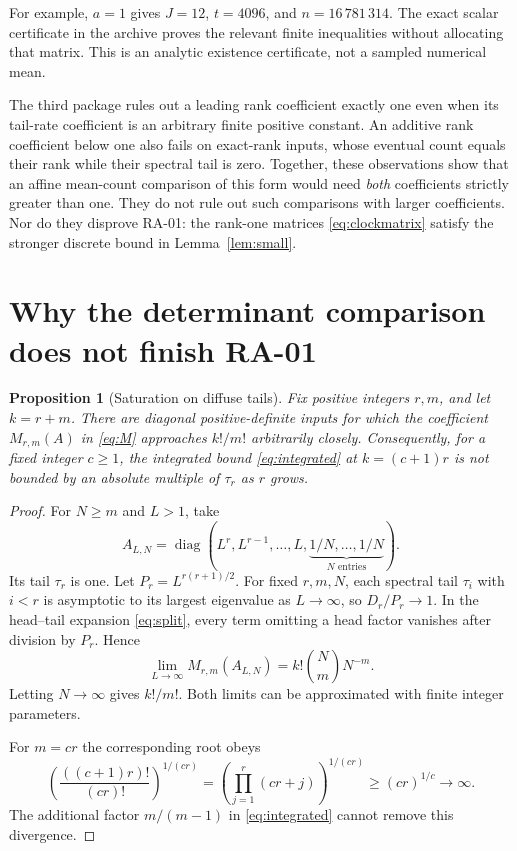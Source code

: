 \documentclass[11pt]{article}
\newtheorem{proposition}[theorem]{Proposition}
\theoremstyle{remark}\newtheorem{remark}[theorem]{Remark}
\begin{document}
For example, $a=1$ gives $J=12$, $t=4096$, and $n=16\,781\,314$. The exact scalar certificate in the archive proves the relevant finite inequalities without allocating that matrix. This is an analytic existence certificate, not a sampled numerical mean.

The third package rules out a leading rank coefficient exactly one even when its tail-rate coefficient is an arbitrary finite positive constant. An additive rank coefficient below one also fails on exact-rank inputs, whose eventual count equals their rank while their spectral tail is zero. Together, these observations show that an affine mean-count comparison of this form would need \emph{both} coefficients strictly greater than one. They do not rule out such comparisons with larger coefficients. Nor do they disprove RA-01: the rank-one matrices \eqref{eq:clockmatrix} satisfy the stronger discrete bound in Lemma~\ref{lem:small}.

\section{Why the determinant comparison does not finish RA-01}
\begin{proposition}[Saturation on diffuse tails]\label{prop:saturation}
Fix positive integers $r,m$, and let $k=r+m$. There are diagonal positive-definite inputs for which the coefficient $M_{r,m}(A)$ in \eqref{eq:M} approaches $k!/m!$ arbitrarily closely. Consequently, for a fixed integer $c\ge1$, the integrated bound \eqref{eq:integrated} at $k=(c+1)r$ is not bounded by an absolute multiple of $\tau_r$ as $r$ grows.
\end{proposition}
\begin{proof}
For $N\ge m$ and $L>1$, take
\[
 A_{L,N}=\operatorname{diag}
 \left(L^r,L^{r-1},\ldots,L,
 \underbrace{1/N,\ldots,1/N}_{N\text{ entries}}\right).
\]
Its tail $\tau_r$ is one. Let $P_r=L^{r(r+1)/2}$. For fixed $r,m,N$, each spectral tail $\tau_i$ with $i<r$ is asymptotic to its largest eigenvalue as $L\to\infty$, so $D_r/P_r\to1$. In the head--tail expansion \eqref{eq:split}, every term omitting a head factor vanishes after division by $P_r$. Hence
\[
 \lim_{L\to\infty}M_{r,m}(A_{L,N})
 =k!\binom Nm N^{-m}.
\]
Letting $N\to\infty$ gives $k!/m!$. Both limits can be approximated with finite integer parameters.

For $m=cr$ the corresponding root obeys
\[
 \left(\frac{((c+1)r)!}{(cr)!}\right)^{1/(cr)}
 =\left(\prod_{j=1}^{r}(cr+j)\right)^{1/(cr)}
 \ge(cr)^{1/c}\longrightarrow\infty.
\]
The additional factor $m/(m-1)$ in \eqref{eq:integrated} cannot remove this divergence.
\end{proof}
\end{document}
